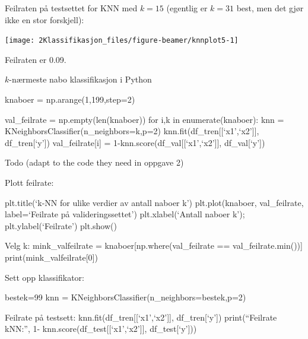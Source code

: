 \documentclass[10pt,ignorenonframetext,]{beamer}
\begin{document}
\begin{frame}

Feilraten på testsettet for KNN med \(k=15\) (egentlig er \(k=31\) best,
men det gjør ikke en stor forskjell):

\begin{center}\texttt{[image: 2Klassifikasjon\_files/figure-beamer/knnplot5-1]} \end{center}

Feilraten er 0.09.

\end{frame}

\begin{frame}{\(k\)-nærmeste nabo klassifikasjon i Python}
\protect\hypertarget{k-nuxe6rmeste-nabo-klassifikasjon-i-python}{}

knaboer = np.arange(1,199,step=2)

val\_feilrate = np.empty(len(knaboer)) for i,k in enumerate(knaboer):
knn = KNeighborsClassifier(n\_neighbors=k,p=2)
knn.fit(df\_tren{[}{[}`x1',`x2'{]}{]}, df\_tren{[}`y'{]})
val\_feilrate{[}i{]} = 1-knn.score(df\_val{[}{[}`x1',`x2'{]}{]},
df\_val{[}`y'{]})

\end{frame}

\begin{frame}{Todo (adapt to the code they need in oppgave 2)}
\protect\hypertarget{todo-adapt-to-the-code-they-need-in-oppgave-2}{}

Plott feilrate:

plt.title(`k-NN for ulike verdier av antall naboer k') plt.plot(knaboer,
val\_feilrate, label=`Feilrate på valideringssettet') plt.xlabel(`Antall
naboer k'); plt.ylabel(`Feilrate') plt.show()

Velg k: mink\_valfeilrate = knaboer{[}np.where(val\_feilrate ==
val\_feilrate.min()){]} print(mink\_valfeilrate{[}0{]})

Sett opp klassifikator:

bestek=99 knn = KNeighborsClassifier(n\_neighbors=bestek,p=2)

Feilrate på testsett: knn.fit(df\_tren{[}{[}`x1',`x2'{]}{]},
df\_tren{[}`y'{]}) print(``Feilrate kNN:'', 1-
knn.score(df\_test{[}{[}`x1',`x2'{]}{]}, df\_test{[}`y'{]}))

\end{frame}
\end{document}
